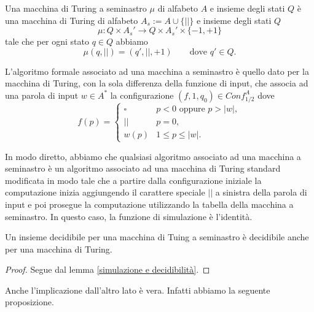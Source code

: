 \begin{defi}
Una macchina di Turing a seminastro $\mu$ di alfabeto $A$ e insieme degli stati $Q$ è una macchina di Turing di alfabeto $A_s:=A\cup\{||\}$ e insieme degli stati $Q$
\[
\mu : Q\times A_s' \to Q\times A_s'\times\{-1,+1\}
\]
tale che per ogni stato $q\in Q$ abbiamo
\[
\mu(q,||)=(q',||,+1) \qquad \text{dove } q'\in Q.
\]
\end{defi}

L'algoritmo formale associato ad una macchina a seminastro è quello dato per la macchina di Turing, con la sola differenza della funzione di input, che associa ad una parola di input $w\in A^*$ la configurazione $(f,1,q_0)\in Conf_{1/2}^A$ dove
\[
f(p)=\begin{cases}
\square & p<0 \text{ oppure } p>|w|,\\
|| & p=0,\\
w(p) & 1\leq p\leq |w|.
\end{cases}
\]

In modo diretto, abbiamo che qualsiasi algoritmo associato ad una macchina a seminastro è un algoritmo associato ad una macchina di Turing standard modificata in modo tale che a partire dalla configurazione iniziale la computazione inizia aggiungendo il carattere speciale $||$ a sinistra della parola di input e poi prosegue la computazione utilizzando la tabella della macchina a seminastro.
In questo caso, la funzione di simulazione è l'identità.
\begin{prop}
    Un insieme decidibile per una 
    macchina di Tuing a seminastro è decidibile
    anche per una macchina di Turing.
    \begin{proof}
        Segue dal lemma
        \ref{simulazione e decidibilità}.
    \end{proof}
\end{prop}
Anche l'implicazione
dall'altro lato è vera. Infatti abbiamo la seguente proposizione.

